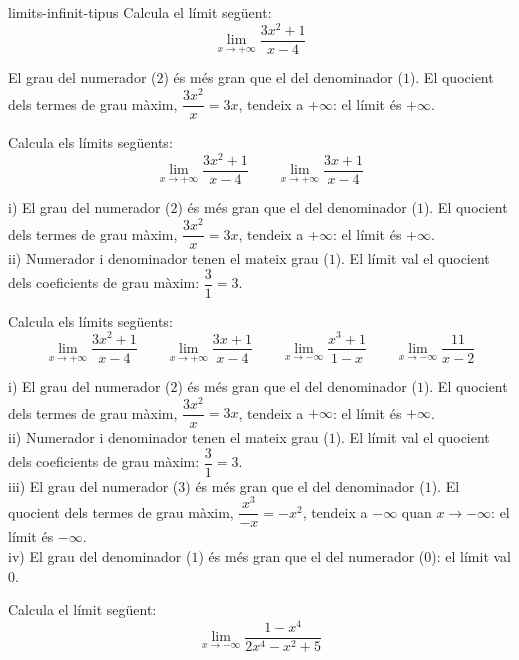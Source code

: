 \begin{apartats}

\begin{tria}{limits-infinit-tipus}
Calcula el límit següent:
\[
\lim_{x\to+\infty}\frac{3x^2+1}{x-4}
\]

\begin{solucio}
El grau del numerador ($2$) és més gran que el del denominador ($1$). El quocient dels termes de
grau màxim, $\dfrac{3x^2}{x}=3x$, tendeix a $+\infty$: el límit és $+\infty$.
\end{solucio}

Calcula els límits següents:
\[
\lim_{x\to+\infty}\frac{3x^2+1}{x-4}
\qquad
\lim_{x\to+\infty}\frac{3x+1}{x-4}
\]

\begin{solucio}
i) El grau del numerador ($2$) és més gran que el del denominador ($1$). El quocient dels termes de
grau màxim, $\dfrac{3x^2}{x}=3x$, tendeix a $+\infty$: el límit és $+\infty$.\\
ii) Numerador i denominador tenen el mateix grau ($1$). El límit val el quocient dels
coeficients de grau màxim: $\dfrac{3}{1}=3$.
\end{solucio}

Calcula els límits següents:
\[
\lim_{x\to+\infty}\frac{3x^2+1}{x-4}
\qquad
\lim_{x\to+\infty}\frac{3x+1}{x-4}
\qquad
\lim_{x\to-\infty}\frac{x^3+1}{1-x}
\qquad
\lim_{x\to-\infty}\frac{11}{x-2}
\]

\begin{solucio}
i) El grau del numerador ($2$) és més gran que el del denominador ($1$). El quocient dels termes de
grau màxim, $\dfrac{3x^2}{x}=3x$, tendeix a $+\infty$: el límit és $+\infty$.\\
ii) Numerador i denominador tenen el mateix grau ($1$). El límit val el quocient dels
coeficients de grau màxim: $\dfrac{3}{1}=3$.\\
iii) El grau del numerador ($3$) és més gran que el del denominador ($1$). El quocient dels termes
de grau màxim, $\dfrac{x^3}{-x}=-x^2$, tendeix a $-\infty$ quan $x\to-\infty$: el límit és $-\infty$.\\
iv) El grau del denominador ($1$) és més gran que el del numerador ($0$): el límit val $0$.
\end{solucio}
\end{tria}

\begin{nomesllarg}
Calcula el límit següent:
\[
\lim_{x\to-\infty}\frac{1-x^4}{2x^4-x^2+5}
\]


\end{nomesllarg}
\end{apartats}
